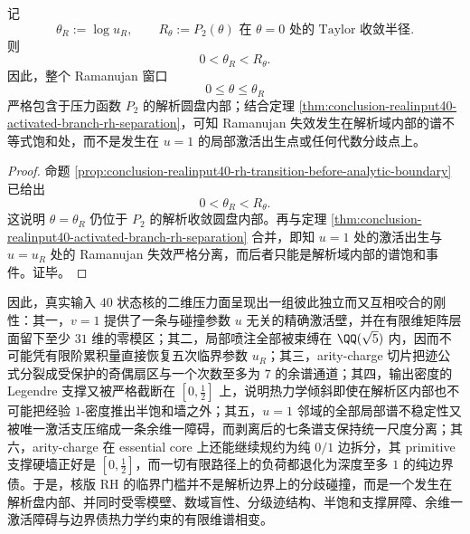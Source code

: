 \begin{corollary}\label{cor:conclusion-realinput40-rh-boundary-analytic-interior-saturation}
记
\[
\theta_R:=\log u_R,
\qquad
R_\theta:=\text{\(P_2(\theta)\) 在 \(\theta=0\) 处的 Taylor 收敛半径}.
\]
则
\[
0<\theta_R<R_\theta.
\]
因此，整个 Ramanujan 窗口
\[
0\le \theta\le \theta_R
\]
严格包含于压力函数 \(P_2\) 的解析圆盘内部；结合定理 \ref{thm:conclusion-realinput40-activated-branch-rh-separation}，可知 Ramanujan 失效发生在解析域内部的谱不等式饱和处，而不是发生在 \(u=1\) 的局部激活出生点或任何代数分歧点上。
\end{corollary}
\begin{proof}
命题 \ref{prop:conclusion-realinput40-rh-transition-before-analytic-boundary} 已给出
\[
0<\theta_R<R_\theta.
\]
这说明 \(\theta=\theta_R\) 仍位于 \(P_2\) 的解析收敛圆盘内部。再与定理 \ref{thm:conclusion-realinput40-activated-branch-rh-separation} 合并，即知 \(u=1\) 处的激活出生与 \(u=u_R\) 处的 Ramanujan 失效严格分离，而后者只能是解析域内部的谱饱和事件。证毕。
\end{proof}



\noindent
因此，真实输入 \(40\) 状态核的二维压力面呈现出一组彼此独立而又互相咬合的刚性：其一，\(v=1\) 提供了一条与碰撞参数 \(u\) 无关的精确激活壁，并在有限维矩阵层面留下至少 \(31\) 维的零模区；其二，局部喷注全部被束缚在 \(\QQ(\sqrt5)\) 内，因而不可能凭有限阶累积量直接恢复五次临界参数 \(u_R\)；其三，arity-charge 切片把迹公式分裂成受保护的奇偶扇区与一个次数至多为 \(7\) 的余谱通道；其四，输出密度的 Legendre 支撑又被严格截断在 \([0,\tfrac12]\) 上，说明热力学倾斜即使在解析区内部也不可能把经验 \(1\)-密度推出半饱和墙之外；其五，\(u=1\) 邻域的全部局部谱不稳定性又被唯一激活支压缩成一条余维一障碍，而剥离后的七条谱支保持统一尺度分离；其六，arity-charge 在 essential core 上还能继续规约为纯 \(0/1\) 边拆分，其 primitive 支撑硬墙正好是 \([0,\tfrac12]\)，而一切有限路径上的负荷都退化为深度至多 \(1\) 的纯边界债。于是，核版 RH 的临界门槛并不是解析边界上的分歧碰撞，而是一个发生在解析盘内部、并同时受零模壁、数域盲性、分级迹结构、半饱和支撑屏障、余维一激活障碍与边界债热力学约束的有限维谱相变。

\endinput
